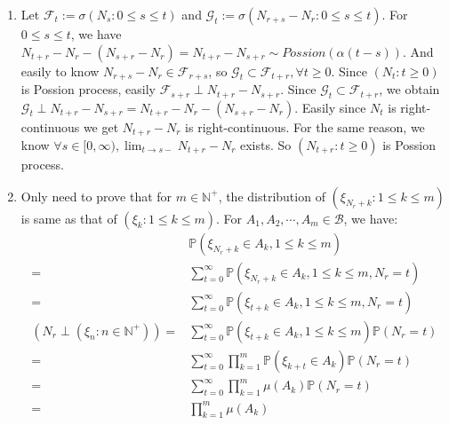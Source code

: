 \documentclass{ctexart}
\begin{document}
\begin{solution}
  \begin{enumerate}
    \item
      Let \(\mathcal{F}_t:=\sigma(N_s:0 \leq s \leq t)\) and \(\mathcal{G}_t:=\sigma(N_{r+s}-N_r:0 \leq s \leq t)\).
      For \(0 \leq s \leq t\), we have \(N_{t+r}-N_r -(N_{s+r}-N_r)=N_{t+r}-N_{s+r} \sim Possion(\alpha(t-s))\).
      And easily to know \(N_{r + s}-N_r \in \mathcal{F}_{r+s}\), so \(\mathcal{G}_t \subset \mathcal{F}_{t+r},\forall t \geq 0\).
      Since \((N_t:t \geq 0)\) is Possion process, easily \(\mathcal{F}_{s+r} \perp N_{t+r}-N_{s+r}\).
      Since \(\mathcal{G}_{t}\subset \mathcal{F}_{t +r}\), we obtain \(\mathcal{G}_t \perp N_{t + r}-N_{s + r}=N_{t+r}-N_r -(N_{s+r}-N_r)\).
      Easily since \(N_t\) is right-continuous we get \(N_{t + r}-N_r\) is right-continuous.
      For the same reason, we know \(\forall s \in [0,\infty),\lim_{t \to s-}N_{t + r}-N_{r}\) exists.
      So \((N_{t+r}:t \geq 0)\) is Possion process.
    \item
      Only need to prove that for \(m \in \mathbb{N}^+\), the distribution of \((\xi_{N_r+k}:1 \leq k \leq m)\) is same as that of \((\xi_k:1 \leq k \leq m)\).
      For \(A_1,A_2,\cdots,A_m \in \mathcal{B}\), we have:
      \begin{equation}\label{equ:1}
        \begin{aligned}
                                                  & \mathbb{P}(\xi_{N_r+k}\in A_k,1 \leq k \leq m)                                       \\
          =                                       & \sum_{t=0}^{\infty} \mathbb{P}(\xi_{N_r + k} \in A_k,1 \leq k \leq m,N_r=t)          \\
          =                                       & \sum_{t=0}^{\infty} \mathbb{P}(\xi_{t + k} \in A_k,1 \leq k \leq m,N_r=t)            \\
          (N_r \perp (\xi_n:n \in \mathbb{N}^+))= & \sum_{t=0}^{\infty} \mathbb{P}(\xi_{t + k} \in A_k,1 \leq k \leq m)\mathbb{P}(N_r=t) \\
          =                                       & \sum_{t=0}^{\infty} \prod_{k=1}^{m} \mathbb{P}(\xi_{k+t} \in A_k)\mathbb{P}(N_r=t)   \\
          =                                       & \sum_{t=0}^{\infty} \prod_{k=1}^{m} \mu(A_k)\mathbb{P}(N_r=t)                        \\
          =                                       & \prod_{k=1}^{m} \mu(A_k)                                                             \\

\end{aligned}
\end{equation}
\end{enumerate}
\end{solution}
\end{document}
